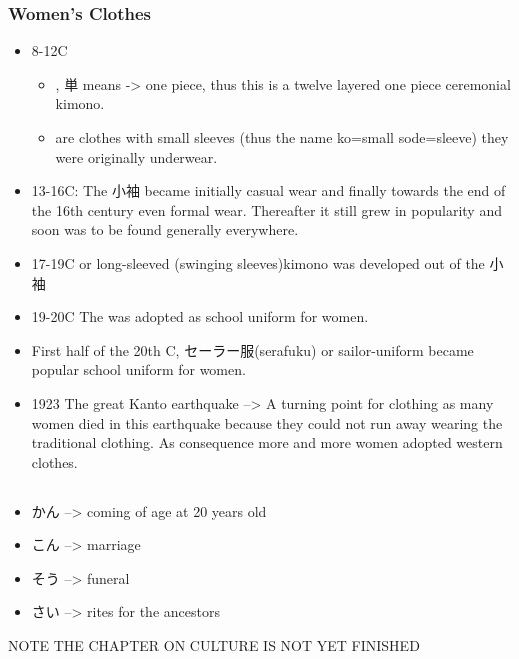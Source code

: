 \documentclass{article}
\begin{document}
\subsubsection*{Women's Clothes}
\begin{itemize}
\item 8-12C
\begin{itemize}
\item {}, 単 means -> one piece, thus this is a twelve layered one piece ceremonial kimono.
\item {} are clothes with small sleeves (thus the name ko=small sode=sleeve) they were originally underwear.
\end{itemize}
\item 13-16C: The 小袖 became initially casual wear and finally towards the end of the 16th century even formal wear. Thereafter it still grew in popularity and soon was to be found generally everywhere.
\item 17-19C  or long-sleeved (swinging sleeves)kimono was developed out of the 小袖
\item 19-20C The  was adopted as school uniform for women.
\item First half of the 20th C, セーラー服(serafuku) or sailor-uniform became popular school uniform for women.
\item 1923 The great Kanto earthquake --> A turning point for clothing as many women died in this earthquake because they could not run away wearing the traditional clothing. As consequence more and more women adopted western clothes.
\end{itemize}
\subsection*{}
\begin{itemize}
\item かん --> coming of age at 20 years old
\item こん --> marriage
\item そう --> funeral
\item さい --> rites for the ancestors
\end{itemize}
\color{red}NOTE THE CHAPTER ON CULTURE IS NOT YET FINISHED
\end{document}
